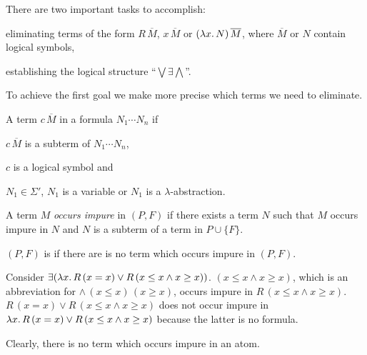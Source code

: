 \documentclass[a4paper,twoside,notitlepage,openright,11pt]{report}
\begin{document}
There are two important tasks to accomplish:
\begin{enumerate*}
\item eliminating terms of the form $R\,\overline M$, $x\,\overline M$ or $(\lambda x\ldotp N)\,\overline M$, where $\overline M$ or $N$ contain logical symbols,
\item establishing the logical structure ``$\bigvee\exists\bigwedge$''.
\end{enumerate*}

To achieve the first goal we make more precise which terms we need to eliminate.
\begin{definition}
  \begin{thmlist}
  \item A term $c\,\overline M$  in a formula $N_1\cdots N_n$ if
    \begin{enumerate*}
    \item $c\,\overline M$ is a subterm of $N_1\cdots N_n$,
    \item $c$ is a logical symbol and
    \item $N_1\in\Sigma'$, $N_1$ is a variable or $N_1$ is a $\lambda$-abstraction.
    \end{enumerate*}
  \item A term $M$ \emph{occurs impure} in $(P,F)$ if there exists a term $N$ such that $M$ occurs impure in $N$ and $N$ is a subterm of a term in $P\cup\{F\}$.
  \item $(P,F)$ is  if there are is no term which occurs impure in $(P,F)$.
  \end{thmlist}
\end{definition}
\begin{example}
  Consider $\exists(\lambda x\ldotp R\,(x=x)\lor R\,(x\leq x\land x\geq x))$. $(x\leq x\land x\geq x)$, which is an abbreviation for $\land\,(x\leq x)\,(x\geq x)$, occurs impure in $R\,(x\leq x\land x\geq x)$. $R\,(x=x)\lor R\,(x\leq x\land x\geq x)$ does not occur impure in $\lambda x\ldotp R\,(x=x)\lor R\,(x\leq x\land x\geq x)$ because the latter is no formula.
\end{example}
Clearly, there is no term which occurs impure in an atom.
\end{document}
